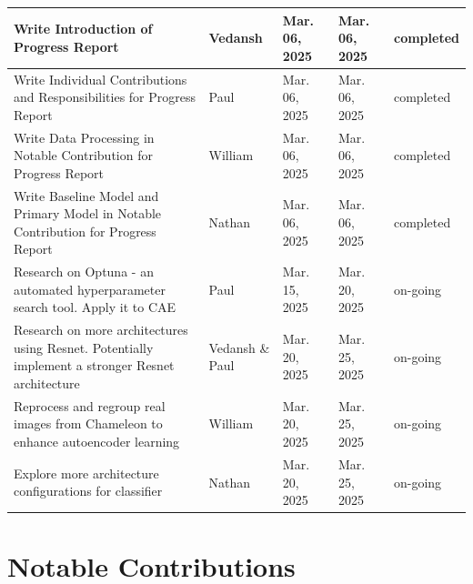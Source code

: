 \documentclass{article} %
\begin{document}
\begin{table}[htp]
\begin{center}
\begin{tabular}{|>{\raggedright\arraybackslash}p{4cm}|>{\raggedright\arraybackslash}p{2.5cm}|>{\raggedright\arraybackslash}p{2cm}|>{\raggedright\arraybackslash}p{2cm}|>{\raggedright\arraybackslash}p{1.5cm}|}
            \hline
            Write Introduction of Progress Report                                                             & Vedansh              & Mar. 06, 2025              & Mar. 06, 2025          & completed       \\
            \hline
            Write Individual Contributions and Responsibilities for Progress Report                           & Paul                 & Mar. 06, 2025              & Mar. 06, 2025          & completed       \\
            \hline
            Write Data Processing in Notable Contribution for Progress Report                                 & William              & Mar. 06, 2025              & Mar. 06, 2025          & completed       \\
            \hline
            Write Baseline Model and Primary Model in Notable Contribution for Progress Report                & Nathan               & Mar. 06, 2025              & Mar. 06, 2025          & completed       \\
            \hline
            Research on Optuna - an automated hyperparameter search tool. Apply it to CAE                     & Paul                 & Mar. 15, 2025              & Mar. 20, 2025          & on-going        \\
            \hline
            Research on more architectures using Resnet. Potentially implement a stronger Resnet architecture & Vedansh \& Paul      & Mar. 20, 2025              & Mar. 25, 2025          & on-going        \\
            \hline
            Reprocess and regroup real images from Chameleon to enhance autoencoder learning                  & William              & Mar. 20, 2025              & Mar. 25, 2025          & on-going        \\
            \hline
            Explore more architecture configurations for classifier                                           & Nathan               & Mar. 20, 2025              & Mar. 25, 2025          & on-going        \\
            \hline
        \end{tabular}
    \end{center}
\end{table}



\section{Notable Contributions}
\end{document}
